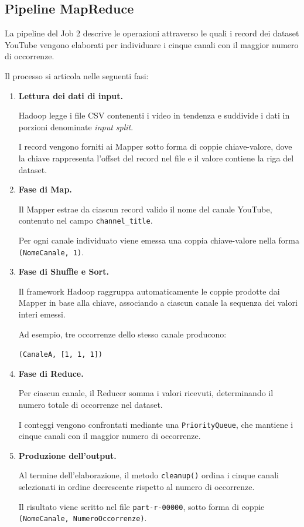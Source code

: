 \documentclass[12pt, a4paper]{article}
\begin{document}
\subsection{Pipeline MapReduce}

La pipeline del Job 2 descrive le operazioni
attraverso le quali i record dei dataset YouTube
vengono elaborati per individuare i cinque canali
con il maggior numero di occorrenze.

Il processo si articola nelle seguenti fasi:

\begin{enumerate}

    \item \textbf{Lettura dei dati di input.}

    Hadoop legge i file CSV contenenti i video
    in tendenza e suddivide i dati in porzioni
    denominate \textit{input split}.

    I record vengono forniti ai Mapper sotto forma
    di coppie chiave-valore, dove la chiave
    rappresenta l'offset del record nel file
    e il valore contiene la riga del dataset.

    \item \textbf{Fase di Map.}

    Il Mapper estrae da ciascun record valido
    il nome del canale YouTube, contenuto nel
    campo \texttt{channel\_title}.

    Per ogni canale individuato viene emessa
    una coppia chiave-valore nella forma
    \texttt{(NomeCanale, 1)}.

    \item \textbf{Fase di Shuffle e Sort.}

    Il framework Hadoop raggruppa automaticamente
    le coppie prodotte dai Mapper in base
    alla chiave, associando a ciascun canale
    la sequenza dei valori interi emessi.

    Ad esempio, tre occorrenze dello stesso
    canale producono:

    \begin{center}
        \texttt{(CanaleA, [1, 1, 1])}
    \end{center}

    \item \textbf{Fase di Reduce.}

    Per ciascun canale, il Reducer somma
    i valori ricevuti, determinando il numero
    totale di occorrenze nel dataset.

    I conteggi vengono confrontati mediante
    una \texttt{PriorityQueue}, che mantiene
    i cinque canali con il maggior numero
    di occorrenze.

    \item \textbf{Produzione dell'output.}

    Al termine dell'elaborazione, il metodo
    \texttt{cleanup()} ordina i cinque canali
    selezionati in ordine decrescente
    rispetto al numero di occorrenze.

    Il risultato viene scritto nel file
    \texttt{part-r-00000}, sotto forma di
    coppie \texttt{(NomeCanale, NumeroOccorrenze)}.

\end{enumerate}
\end{document}
